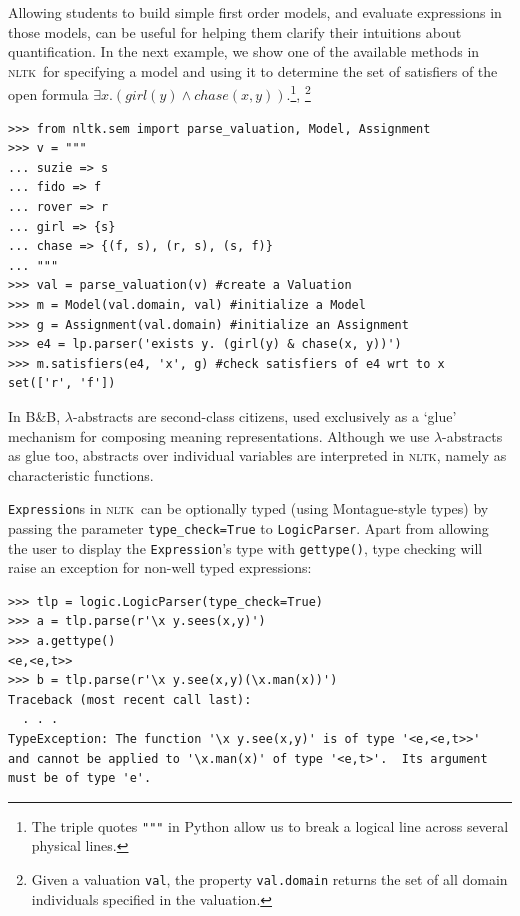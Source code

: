 \documentclass[11pt, a4paper]{article}
\newcommand{\BB}{\textsc{B{\small\&}B}}
\newcommand{\NLTK}{\textsc{nltk}}
\begin{document}
Allowing students to build simple first order models, and evaluate
expressions in those models, can be useful for helping them clarify
their intuitions about quantification. In the next example, we show
one of the available methods in \NLTK\ for specifying a model and
using it to determine the set of satisfiers of the open formula
$\exists x.(\mathit{girl}(y) \wedge
\mathit{chase}(x,y))$.\footnote{The triple quotes \texttt{"""} in
  Python allow us to break a logical line across several physical
  lines.},
\footnote{Given a valuation \texttt{val}, the property
  \texttt{val.domain} returns the set of all domain individuals
  specified in the valuation.}
\begin{Verbatim}
>>> from nltk.sem import parse_valuation, Model, Assignment
>>> v = """
... suzie => s
... fido => f
... rover => r
... girl => {s}
... chase => {(f, s), (r, s), (s, f)}
... """
>>> val = parse_valuation(v) #create a Valuation
>>> m = Model(val.domain, val) #initialize a Model
>>> g = Assignment(val.domain) #initialize an Assignment
>>> e4 = lp.parser('exists y. (girl(y) & chase(x, y))')
>>> m.satisfiers(e4, 'x', g) #check satisfiers of e4 wrt to x
set(['r', 'f'])
\end{Verbatim}

In \BB, $\lambda$-abstracts are second-class citizens, used
exclusively as a `glue' mechanism for composing meaning
representations. Although we use $\lambda$-abstracts as glue too,
abstracts over individual variables are interpreted in \NLTK, namely as
characteristic functions.

\texttt{Expression}s in \NLTK\ can be optionally typed (using
Montague-style types) by passing the parameter \texttt{type\_check=True} to
\texttt{LogicParser}.  Apart from allowing the user to display the
\texttt{Expression}'s type with \texttt{gettype()}, type checking will
raise an exception for non-well typed expressions:
\begin{Verbatim}
>>> tlp = logic.LogicParser(type_check=True)
>>> a = tlp.parse(r'\x y.sees(x,y)')
>>> a.gettype()
<e,<e,t>>
>>> b = tlp.parse(r'\x y.see(x,y)(\x.man(x))')
Traceback (most recent call last):
  . . .
TypeException: The function '\x y.see(x,y)' is of type '<e,<e,t>>' 
and cannot be applied to '\x.man(x)' of type '<e,t>'.  Its argument 
must be of type 'e'.
\end{Verbatim}
\end{document}
